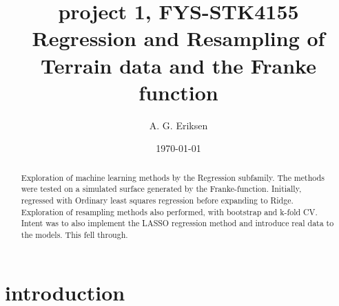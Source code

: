 \documentclass[15pt comic sans]{revtex4-2}
\begin{document}
\title{%
	project 1, FYS-STK4155 \\
	\large Regression and Resampling of Terrain data and the Franke function}
\author{A. G. Eriksen}
\date{\today}
\begin{abstract}
	Exploration of machine learning methods by the Regression subfamily.
	The methods were tested on a simulated surface generated by the Franke-function.
	Initially, regressed with Ordinary least squares regression before
	expanding to Ridge. Exploration of resampling methods also performed, with
	bootstrap and k-fold CV. Intent was to also implement the LASSO regression method
	and introduce real data to the models. This fell through.
\end{abstract}
\maketitle
\tableofcontents

\section{introduction}
\end{document}

